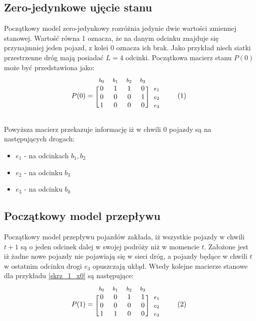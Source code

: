 \documentclass[12pt]{book}
\newcommand\addtag{\refstepcounter{equation}\tag{\theequation}}
\begin{document}
\subsection{Zero-jedynkowe ujęcie stanu}
Początkowy model zero-jedynkowy rozróżnia jedynie dwie wartości zmiennej stanowej. Wartość równa 1 oznacza, że na danym odcinku znajduje się przynajmniej jeden pojazd, z kolei 0 oznacza ich brak. Jako przykład niech siatki przestrzenne dróg mają posiadać $L=4$ odcinki. Początkowa macierz stanu $P(0)$ może być przedstawiona jako:
\begin{equation*}
  P(0)=
  \begin{blockarray}{*{4}{c} l}
    \begin{block}{*{4}{>{$\footnotesize}c<{$}} l}
      $b_0$ & $b_1$ & $b_2$ & $b_3$ \\
    \end{block}
    \begin{block}{[*{4}{c}]>{$\footnotesize}l<{$}}
       0 & 1 & 1 & 0 & $e_1$ \\
       0 & 0 & 0 & 1 & $e_2$ \\
       1 & 0 & 0 & 0 & $e_3$ \\
    \end{block}
  \end{blockarray} \addtag \label{skrz_1_x0}
\end{equation*}


Powyższa macierz przekazuje informację iż w chwili $0$ pojazdy są na następujących drogach:
\begin{itemize}
\item $e_1$ - na odcinkach $b_1,b_2$ 
\item $e_2$ - na odcinku $b_3$ 
\item $e_3$ - na odcinku $b_0$ 
\end{itemize}
\subsection{Początkowy model przepływu}
Początkowy model przepływu pojazdów zakłada, iż wszystkie pojazdy w chwili $t+1$ są o jeden odcinek dalej w swojej podróży niż w momencie $t$. Założone jest iż żadne nowe pojazdy nie pojawiają się w sieci dróg, a pojazdy będące w chwili $t$ w ostatnim odcinku drogi $e_3$ opuszczają ukłąd. Wtedy kolejne macierze stanowe dla przykładu \ref{skrz_1_x0} są następujące:
\begin{equation*}
  P(1)=
  \begin{blockarray}{*{4}{c} l}
    \begin{block}{*{4}{>{$\footnotesize}c<{$}} l}
      $b_0$ & $b_1$  & $b_2$ & $b_3$ \\
    \end{block}
    \begin{block}{[*{4}{c}]>{$\footnotesize}l<{$}}
       0 & 0 & 1 & 1 & $e_1$ \\
       0 & 0 & 0 & 0 & $e_2$ \\
       1 & 1 & 0 & 0 & $e_3$ \\
    \end{block}
  \end{blockarray} \addtag
\end{equation*}
\end{document}
